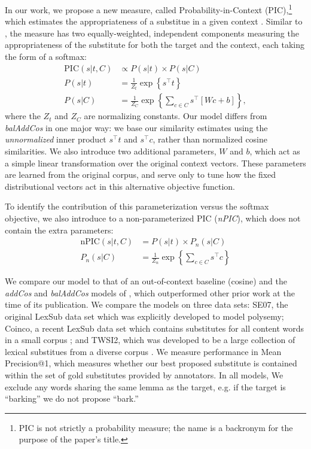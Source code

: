 \documentclass[12pt]{article}
\begin{document}
In our work, we propose a new measure, called Probability-in-Context (PIC),\footnote{PIC is not strictly a probability measure; the name is a backronym for the purpose of the paper's title.}
which estimates the appropriateness of a substitue in a given context
\cite{roller:2016:naacl}.  Similar to \balAddCos, the measure has two
equally-weighted, independent components measuring the appropriateness of the
substitute for both the target and the context, each taking the form of a
softmax:
\begin{equation}
  \begin{aligned}
  \mbox{PIC}(s | t, C) &\propto P(s | t) \times P(s | C)\\
  P(s | t) &= \frac{1}{Z_t}\exp\left\{s^\top t\right\}\\
  P(s | C) &= \frac{1}{Z_C}\exp\left\{\sum_{c\in C}s^\top\left[Wc + b\right]\right\},
  \end{aligned}
  \label{eqn:pic}
\end{equation}
where the $Z_t$ and $Z_C$ are normalizing constants.
Our model differs from {\em balAddCos} in one major way: we base our similarity
estimates using the {\em unnormalized} inner product $s^\top t$ and $s^\top c$,
rather than normalized cosine similarities. We also introduce two additional
parameters, $W$ and $b$, which act as a simple linear transformation over the
original context vectors. These parameters are learned from the original
corpus, and serve only to tune how the fixed distributional vectors act in this
alternative objective function.

To identify the contribution of this parameterization versus the softmax
objective, we also introduce to a non-parameterized PIC ({\em nPIC}), which
does not contain the extra parameters:
\begin{equation}
  \begin{aligned}
  \mbox{nPIC}(s | t, C) &= P(s | t) \times P_n(s | C)\\
  P_n(s | C) &= \frac{1}{Z_n}\exp\left\{\sum_{c\in C}s^\top c\right\}
  \end{aligned}
  \label{eqn:npic}
\end{equation}

We compare our model to that of an out-of-context baseline (cosine) and the
{\em addCos} and {\em balAddCos} models of , which
outperformed other prior work at the time of its publication. We compare the
models on three data sets: SE07, the original LexSub data set
\cite{mccarthy:2007:semeval} which was explicitly developed to model polysemy;
Coinco, a recent LexSub data set which contains substitutes for all content
words in a small corpus \cite{kremer:2014:eacl}; and TWSI2, which was developed
to be a large collection of lexical substitues from a diverse corpus
\cite{biemann:2012:lrec}. We measure performance in Mean Precision@1, which
measures whether our best proposed substitute is contained within the set of gold
substitutes provided by annotators. In all models, We exclude any words sharing
the same lemma as the target, e.g. if the target is ``barking'' we do not
propose ``bark.''
\end{document}
